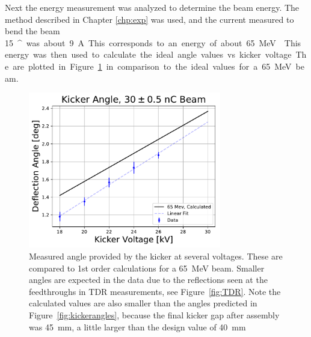 Next the energy measurement was analyzed to determine the beam energy. 
The method described in Chapter \ref{chp:exp} was used, 
and the current measured to bend the beam \SI{15}{^\circ} was about \SI{9}{A}.
This corresponds to an energy of about \SI{65}{MeV} . 
This energy was then used to calculate the ideal angle values vs. kicker voltage.
The are plotted in Figure~\ref{fig:angles} in comparison 
to the ideal values for a \SI{65}{MeV} beam. 
\begin{figure}
	\centering
	\includegraphics[width=0.75\textwidth]{./images/kicker_angle_comparison}
	\caption{Measured angle provided by the kicker at several voltages.  
	These are compared to 1st order calculations for a \SI{65}{MeV} beam.
	Smaller angles are expected in the data due to the reflections
	seen at the feedthroughs in TDR measurements, see Figure~\ref{fig:TDR}.
	Note the calculated values are also smaller than the 
	angles predicted in Figure~\ref{fig:kickerangles}, 
	because the final kicker gap after assembly was \SI{45}{mm}, a little larger
	than the design value of \SI{40}{mm}}
	\label{fig:angles}
\end{figure}

